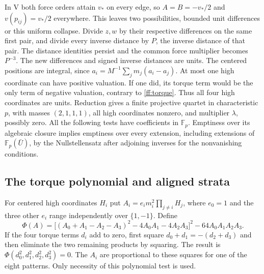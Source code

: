 \documentclass[11pt,letterpaper]{article}
\theoremstyle{definition}
\begin{document}
In V both force orders attain $v_*$ on every edge, so
$A=B=-v_*/2$ and $v(p_{ij})=v_*/2$ everywhere. This leaves two
possibilities, bounded unit differences or this uniform collapse.
Divide $z,w$ by their respective differences on the same first pair,
and divide every inverse distance by $P$, the inverse distance of
that pair. The distance identities persist and the common force
multiplier becomes $P^{-3}$. The new differences and signed inverse
distances are units. The centered positions are integral, since
$a_i=M^{-1}\sum_jm_j(a_i-a_j)$. At most one high coordinate can
have positive valuation. If one did, its torque term would be the
only term of negative valuation, contrary to \eqref{ff:torque}.
Thus all four high coordinates are units. Reduction gives a finite
projective quartet in characteristic $p$, with masses $(2,1,1,1)$,
all high coordinates nonzero, and multiplier $\lambda$, possibly
zero. All the following tests have coefficients in $\mathbb F_p$.
Emptiness over its algebraic closure implies emptiness over every
extension, including extensions of $\mathbb F_p(\bar U)$, by the
Nullstellensatz after adjoining inverses for the nonvanishing conditions.

\subsection{The torque polynomial and aligned strata}

For centered high coordinates $H_i$ put
$A_i=e_i m_i^2\prod_{j\ne i}H_j$, where $e_0=1$ and the three
other $e_i$ range independently over $\{1,-1\}$. Define
\begin{equation}
 \Phi(A)=\big[(A_0+A_1-A_2-A_3)^2-4A_0A_1-4A_2A_3\big]^2
              -64A_0A_1A_2A_3 .\label{ff:phi}
\end{equation}
If the four torque terms $d_i$ add to zero, first square
$d_0+d_1=-(d_2+d_3)$ and then eliminate the two remaining products
by squaring. The result is $\Phi(d_0^2,d_1^2,d_2^2,d_3^2)=0$.
The $A_i$ are proportional to these squares for one of the eight
patterns. Only necessity of this polynomial test is used.
\end{document}
